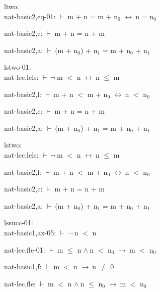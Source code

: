 \documentclass[a4paper]{article}
\newcommand{\Fol}{\mbox{$\vdash\ $}}
\newcommand{\Not}{\mbox{$\neg\ $}}
\newcommand{\And}{\mbox{$\wedge\ $}}
\newcommand{\Imp}{\mbox{$\rightarrow\ $}}
\newcommand{\Equiv}{\mbox{$\leftrightarrow\ $}}
\begin{document}
\bigskip

ltwo:\\ nat-basic2,eq-01: 
 \Fol m + n = m + $\mbox{n}_{0}$ \Equiv n = $\mbox{n}_{0}$



nat-basic2,c: 
 \Fol m + n = n + m



nat-basic2,a: 
 \Fol (m + $\mbox{n}_{0}$) + $\mbox{n}_{1}$ = m + $\mbox{n}_{0}$ + $\mbox{n}_{1}$



\bigskip

lstwo-01:\\ nat-lec,lels: 
 \Fol \Not m $<$ n \Equiv n $\le$ m



nat-basic2,l: 
 \Fol m + n $<$ m + $\mbox{n}_{0}$ \Equiv n $<$ $\mbox{n}_{0}$



nat-basic2,c: 
 \Fol m + n = n + m



nat-basic2,a: 
 \Fol (m + $\mbox{n}_{0}$) + $\mbox{n}_{1}$ = m + $\mbox{n}_{0}$ + $\mbox{n}_{1}$



\bigskip

lstwo:\\ nat-lec,lels: 
 \Fol \Not m $<$ n \Equiv n $\le$ m



nat-basic2,l: 
 \Fol m + n $<$ m + $\mbox{n}_{0}$ \Equiv n $<$ $\mbox{n}_{0}$



nat-basic2,c: 
 \Fol m + n = n + m



nat-basic2,a: 
 \Fol (m + $\mbox{n}_{0}$) + $\mbox{n}_{1}$ = m + $\mbox{n}_{0}$ + $\mbox{n}_{1}$



\bigskip

lssucc-01:\\ nat-basic1,ax-05: 
 \Fol \Not n $<$ n



nat-lec,fle-01: 
 \Fol m $\le$ n \And n $<$ $\mbox{n}_{0}$ \Imp m $<$ $\mbox{n}_{0}$



nat-basic1,f: 
 \Fol m $<$ n \Imp n $\neq$ 0



nat-lec,fle: 
 \Fol m $<$ n \And n $\le$ $\mbox{n}_{0}$ \Imp m $<$ $\mbox{n}_{0}$
\end{document}
